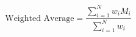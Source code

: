 \begin{equation}
  \label{eqn:weighted_avg}
  \text{Weighted Average} = \frac{\sum_{i=1}^{N} w_i M_i}{\sum_{i=1}^{N} w_i}
\end{equation}

